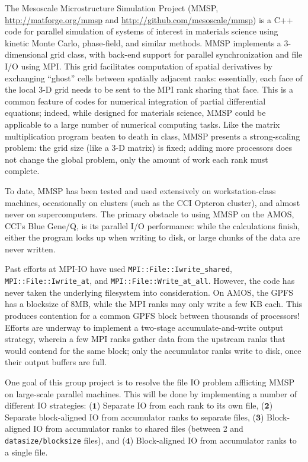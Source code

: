 \documentclass[11pt]{article}
\begin{document}
\begin{multicols}{2}
The Mesoscale Microstructure Simulation Project (MMSP, \url{http://matforge.org/mmsp} and \url{http://github.com/mesoscale/mmsp}) is a C++ code for parallel simulation of systems of interest in materials science using kinetic Monte Carlo, phase-field, and similar methods.
MMSP implements a 3-dimensional grid class, with back-end support for parallel synchronization and file I/O using MPI.
This grid facilitates computation of spatial derivatives by exchanging ``ghost'' cells between spatially adjacent ranks:
essentially, each face of the local 3-D grid needs to be sent to the MPI rank sharing that face.
This is a common feature of codes for numerical integration of partial differential equations;
indeed, while designed for materials science, MMSP could be applicable to a large number of numerical computing tasks.
Like the matrix multiplication program beaten to death in class, MMSP presents a strong-scaling problem:
the grid size (like a 3-D matrix) is fixed; adding more processors does not change the global problem, only the amount of work each rank must complete.

To date, MMSP has been tested and used extensively on workstation-class machines, occasionally on clusters (such as the CCI Opteron cluster), and almost never on supercomputers.
The primary obstacle to using MMSP on the AMOS, CCI's Blue Gene/Q, is its parallel I/O performance:
while the calculations finish, either the program locks up when writing to disk, or large chunks of the data are never written.

Past efforts at MPI-IO have used \texttt{MPI::File::Iwrite\_shared}, \texttt{MPI::File::Iwrite\_at}, and \texttt{MPI::File::Write\_at\_all}.
However, the code has never taken the underlying filesystem into consideration.
On AMOS, the GPFS has a blocksize of 8MB, while the MPI ranks may only write a few KB each.
This produces contention for a common GPFS block between thousands of processors!
Efforts are underway to implement a two-stage accumulate-and-write output strategy, wherein a few MPI ranks gather data from the upstream ranks that would contend for the same block;
only the accumulator ranks write to disk, once their output buffers are full.

One goal of this group project is to resolve the file IO problem afflicting MMSP on large-scale parallel machines.
This will be done by implementing a number of different IO strategies: 
($\mathbf{1}$) Separate IO from each rank to its own file,
($\mathbf{2}$) Separate block-aligned IO from accumulator ranks to separate files,
($\mathbf{3}$) Block-aligned IO from accumulator ranks to shared files (between 2 and \texttt{datasize/blocksize} files), and
($\mathbf{4}$) Block-aligned IO from accumulator ranks to a single file.


\end{multicols}
\end{document}
